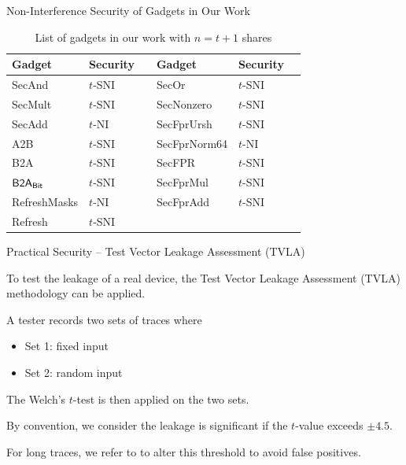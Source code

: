 \begin{frame}{Non-Interference Security of Gadgets in Our Work}

\begin{table}
\centering
\begin{tabular}{l l | l l} 
\toprule
\textbf{Gadget} & \textbf{Security$\quad$} & \textbf{Gadget} & \textbf{Security$\quad$} \\
\midrule
{\sf SecAnd} & $t$-SNI & {\sf SecOr} & $t$-SNI \\
{\sf SecMult} & $t$-SNI & {\sf SecNonzero} & $t$-SNI \\
{\sf SecAdd} & $t$-NI & {\sf SecFprUrsh} & $t$-SNI \\
{\sf A2B} & $t$-SNI & {\sf SecFprNorm64} & $t$-NI\\
{\sf B2A} & $t$-SNI & {\sf SecFPR} & $t$-SNI \\
${\sf B2A_{Bit}}$ & $t$-SNI & {\sf SecFprMul} & $t$-SNI\\
{\sf RefreshMasks} & $t$-NI & {\sf SecFprAdd} & $t$-SNI\\
{\sf Refresh} & $t$-SNI \\
\bottomrule
\end{tabular}
\caption{List of gadgets in our work with $n=t+1$ shares}
\label{table:gadgets_secureity}
\end{table}
\end{frame}


\begin{frame}{Practical Security – Test Vector Leakage Assessment (TVLA)}

To test the leakage of a real device, the Test Vector Leakage Assessment (TVLA) methodology \cite{gilbert2011testing} can be applied.
\pause

A tester records two sets of traces where
\pause

\begin{itemize}
	\item Set 1: fixed input
	\pause
	\item Set 2: random input
\end{itemize}
\pause

The Welch's $t$-test is then applied on the two sets.
\pause

By convention, we consider the leakage is significant if the $t$-value exceeds $\pm 4.5$.
\pause

For long traces, we refer to \cite{ding2018towards} to alter this threshold to avoid false positives.

\end{frame}



